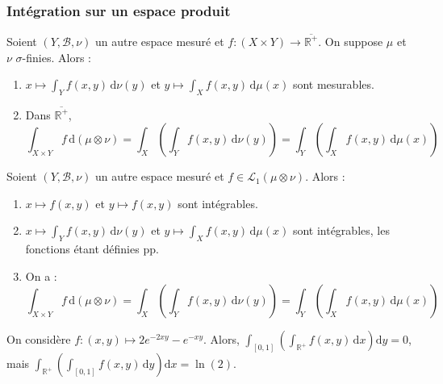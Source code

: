  \subsubsection{Intégration sur un espace produit}


  \begin{theorem}
    Soient $(Y, \mathcal{B}, \nu)$ un autre espace mesuré et $f : (X \times Y) \rightarrow \overline{\mathbb{R}^+}$. On suppose $\mu$ et $\nu$ $\sigma$-finies. Alors :
    \begin{enumerate}[label=(\roman*)]
      \item $x \mapsto \int_Y f(x,y) \, \mathrm{d}\nu(y)$ et $y \mapsto \int_X f(x,y) \, \mathrm{d}\mu(x)$ sont mesurables.
      \item Dans $\overline{\mathbb{R}^+}$,
      \[ \int_{X \times Y} f \, \mathrm{d}(\mu \otimes \nu) = \int_X \left( \int_Y f(x,y) \, \mathrm{d}\nu(y) \right) = \int_Y \left( \int_X f(x,y) \, \mathrm{d}\mu(x) \right) \]
    \end{enumerate}
  \end{theorem}

  \begin{theorem}
    Soient $(Y, \mathcal{B}, \nu)$ un autre espace mesuré et $f \in \mathcal{L}_1 (\mu \otimes \nu)$. Alors :
    \begin{enumerate}[label=(\roman*)]
      \item $x \mapsto f(x,y)$ et $y \mapsto f(x,y)$ sont intégrables.
      \item $x \mapsto \int_Y f(x,y) \, \mathrm{d}\nu(y)$ et $y \mapsto \int_X f(x,y) \, \mathrm{d}\mu(x)$ sont intégrables, les fonctions étant définies pp.
      \item On a :
      \[ \int_{X \times Y} f \, \mathrm{d}(\mu \otimes \nu) = \int_X \left( \int_Y f(x,y) \, \mathrm{d}\nu(y) \right) = \int_Y \left( \int_X f(x,y) \, \mathrm{d}\mu(x) \right) \]
    \end{enumerate}
  \end{theorem}

  \begin{cexample}
    On considère $f : (x,y) \mapsto 2e^{-2xy} - e^{-xy}$. Alors, $\int_{[0,1]} \left( \int_{\mathbb{R}^+} f(x,y) \, \mathrm{d}x \right) \mathrm{d}y = 0$, mais $\int_{\mathbb{R}^+} \left( \int_{[0,1]} f(x,y) \, \mathrm{d}y \right) \mathrm{d}x = \ln(2)$.
  \end{cexample}

